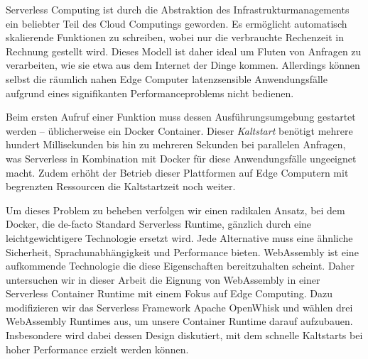 \documentclass[draft, final, x11names, svgnames]{template/vutinfth} %
\begin{document}
\frontmatter %

\addstatementpage

\begin{danksagung*}
\end{danksagung*}

\begin{acknowledgements*}
\end{acknowledgements*}

\begin{kurzfassung}

Serverless Computing ist durch die Abstraktion des Infrastrukturmanagements ein beliebter Teil des Cloud Computings geworden. Es ermöglicht automatisch skalierende Funktionen zu schreiben, wobei nur die verbrauchte Rechenzeit in Rechnung gestellt wird. Dieses Modell ist daher ideal um Fluten von Anfragen zu verarbeiten, wie sie etwa aus dem Internet der Dinge kommen. Allerdings können selbst die räumlich nahen Edge Computer latenzsensible Anwendungsfälle aufgrund eines signifikanten Performanceproblems nicht bedienen.

Beim ersten Aufruf einer Funktion muss dessen Ausführungsumgebung gestartet werden -- üblicherweise ein Docker Container. Dieser \emph{Kaltstart} benötigt mehrere hundert Millisekunden bis hin zu mehreren Sekunden bei parallelen Anfragen, was Serverless in Kombination mit Docker für diese Anwendungsfälle ungeeignet macht. Zudem erhöht der Betrieb dieser Plattformen auf Edge Computern mit begrenzten Ressourcen die Kaltstartzeit noch weiter.

Um dieses Problem zu beheben verfolgen wir einen radikalen Ansatz, bei dem Docker, die de-facto Standard Serverless Runtime, gänzlich durch eine leichtgewichtigere Technologie ersetzt wird. Jede Alternative muss eine ähnliche Sicherheit, Sprachunabhängigkeit und Performance bieten. WebAssembly ist eine aufkommende Technologie die diese Eigenschaften bereitzuhalten scheint. Daher untersuchen wir in dieser Arbeit die Eignung von WebAssembly in einer Serverless Container Runtime mit einem Fokus auf Edge Computing. Dazu modifizieren wir das Serverless Framework Apache OpenWhisk und wählen drei WebAssembly Runtimes aus, um unsere Container Runtime darauf aufzubauen. Insbesondere wird dabei dessen Design diskutiert, mit dem schnelle Kaltstarts bei hoher Performance erzielt werden können.


\end{kurzfassung}
\end{document}
